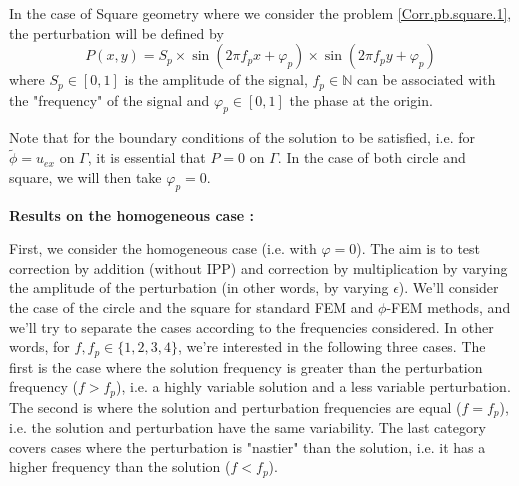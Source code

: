 In the case of Square geometry where we consider the problem \ref{Corr.pb.square.1}, the perturbation will be defined by
\begin{equation*}
	P(x,y)=S_p\times\sin\left(2\pi f_px+\varphi_p\right)\times\sin\left(2\pi f_py+\varphi_p\right)
\end{equation*}
where $S_p\in[0,1]$ is the amplitude of the signal, $f_p\in\mathbb{N}$ can be associated with the "frequency" of the signal and $\varphi_p\in[0,1]$ the phase at the origin.

\begin{Rem}
	Note that for the boundary conditions of the solution to be satisfied, i.e. for $\tilde{\phi}=u_{ex}$ on $\Gamma$, it is essential that $P=0$ on $\Gamma$. In the case of both circle and square, we will then take $\varphi_p=0$.
\end{Rem}

\textbf{Results on the homogeneous case :}

First, we consider the homogeneous case (i.e. with $\varphi=0$). The aim is to test correction by addition (without IPP) and correction by multiplication by varying the amplitude of the perturbation (in other words, by varying $\epsilon$). We'll consider the case of the circle and the square for standard FEM and $\phi$-FEM methods, and we'll try to separate the cases according to the frequencies considered. In other words, for $f,f_p\in\{1,2,3,4\}$, we're interested in the following three cases. The first is the case where the solution frequency is greater than the perturbation frequency ($f>f_p$), i.e. a highly variable solution and a less variable perturbation. The second is where the solution and perturbation frequencies are equal ($f=f_p$), i.e. the solution and perturbation have the same variability. The last category covers cases where the perturbation is "nastier" than the solution, i.e. it has a higher frequency than the solution ($f<f_p$).

